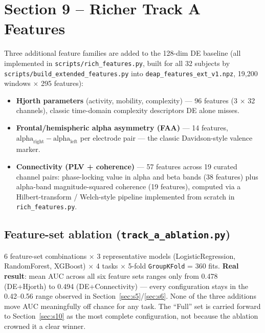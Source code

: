 \documentclass[11pt]{report}
\begin{document}
\section{Section 9 -- Richer Track A Features}
\label{sec:s9}
Three additional feature families are added to the 128-dim DE baseline (all
implemented in \texttt{scripts/rich\_features.py}, built for all 32 subjects
by \texttt{scripts/build\_extended\_features.py} into
\texttt{deap\_features\_ext\_v1.npz}, 19{,}200 windows $\times$ 295 features):
\begin{itemize}
  \item \textbf{Hjorth parameters} (activity, mobility, complexity) --- 96
        features (3 $\times$ 32 channels), classic time-domain complexity
        descriptors DE alone misses.
  \item \textbf{Frontal/hemispheric alpha asymmetry (FAA)} --- 14 features,
        $\text{alpha}_{\text{right}} - \text{alpha}_{\text{left}}$ per
        electrode pair --- the classic Davidson-style valence marker.
  \item \textbf{Connectivity (PLV + coherence)} --- 57 features across 19
        curated channel pairs: phase-locking value in alpha and beta bands
        (38 features) plus alpha-band magnitude-squared coherence (19
        features), computed via a Hilbert-transform / Welch-style pipeline
        implemented from scratch in \texttt{rich\_features.py}.
\end{itemize}

\subsection{Feature-set ablation (\texttt{track\_a\_ablation.py})}
6 feature-set combinations $\times$ 3 representative models
(LogisticRegression, RandomForest, XGBoost) $\times$ 4 tasks $\times$ 5-fold
\texttt{GroupKFold} = 360 fits. \textbf{Real result}: mean AUC across all six
feature sets ranges only from 0.478 (DE+Hjorth) to 0.494
(DE+Connectivity) --- every configuration stays in the 0.42--0.56 range
observed in Section~\ref{sec:s5}/\ref{sec:s6}. None of the three additions
move AUC meaningfully off chance for any task. The ``Full'' set is carried
forward to Section~\ref{sec:s10} as the most complete configuration, not
because the ablation crowned it a clear winner.
\end{document}
